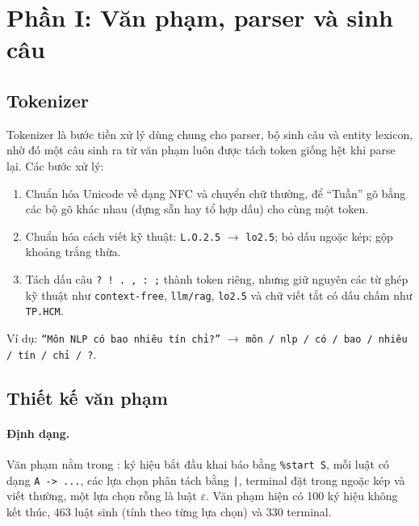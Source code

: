 \section{Phần I: Văn phạm, parser và sinh câu}
\label{sec:part1}

\subsection{Tokenizer}

Tokenizer là bước tiền xử lý dùng chung cho parser, bộ sinh câu và entity lexicon,
nhờ đó một câu sinh ra từ văn phạm luôn được tách token giống hệt khi parse lại. Các
bước xử lý:
\begin{enumerate}
  \item Chuẩn hóa Unicode về dạng NFC và chuyển chữ thường, để ``Tuần'' gõ bằng các bộ
        gõ khác nhau (dựng sẵn hay tổ hợp dấu) cho cùng một token.
  \item Chuẩn hóa cách viết kỹ thuật: \texttt{L.O.2.5} $\rightarrow$ \texttt{lo2.5};
        bỏ dấu ngoặc kép; gộp khoảng trắng thừa.
  \item Tách dấu câu \texttt{? ! . , : ;} thành token riêng, nhưng giữ nguyên các từ
        ghép kỹ thuật như \texttt{context-free}, \texttt{llm/rag}, \texttt{lo2.5}
        và chữ viết tắt có dấu chấm như \texttt{TP.HCM}.
\end{enumerate}
Ví dụ: \texttt{``Môn NLP có bao nhiêu tín chỉ?''} $\rightarrow$
\texttt{môn / nlp / có / bao / nhiêu / tín / chỉ / ?}.

\subsection{Thiết kế văn phạm}

\paragraph{Định dạng.} Văn phạm nằm trong : ký hiệu bắt đầu khai
báo bằng \texttt{\%start S}, mỗi luật có dạng \texttt{A -> ...}, các lựa chọn phân tách
bằng \texttt{|}, terminal đặt trong ngoặc kép và viết thường, một lựa chọn rỗng là
luật $\varepsilon$. Văn phạm hiện có 100 ký hiệu không kết thúc, 463 luật sinh (tính
theo từng lựa chọn) và 330 terminal.

